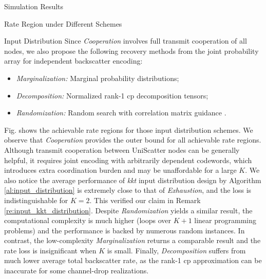 \documentclass[journal]{IEEEtran}
\begin{document}
\begin{section}{Simulation Results}
\begin{subsection}{Rate Region under Different Schemes}
\begin{subsubsection}{Input Distribution}
			Since \emph{Cooperation} involves full transmit cooperation of all nodes, we also propose the following recovery methods from the joint probability array for independent backscatter encoding:
			\begin{itemize}
				\item \emph{Marginalization:} Marginal probability distributions;
				\item \emph{Decomposition:} Normalized rank-\num{1} \gls{cp} decomposition tensors;
				\item \emph{Randomization:} Random search with correlation matrix guidance \cite{Calvo2010}.
			\end{itemize}

			Fig.  shows the achievable rate regions for those input distribution schemes.
			We observe that \emph{Cooperation} provides the outer bound for all achievable rate regions.
			Although transmit cooperation between UniScatter nodes can be generally helpful, it requires joint encoding with arbitrarily dependent codewords, which introduces extra coordination burden and may be unaffordable for a large $K$.
			We also notice the average performance of \emph{\gls{kkt}} input distribution design by Algorithm \ref{al:input_distribution} is extremely close to that of \emph{Exhaustion}, and the loss is indistinguishable for $K=2$.
			This verified our claim in Remark \ref{re:input_kkt_distribution}.
			Despite \emph{Randomization} yields a similar result, the computational complexity is much higher (loops over $K+1$ linear programming problems) and the performance is backed by numerous random instances.
			In contrast, the low-complexity \emph{Marginalization} returns a comparable result and the rate loss is insignificant when $K$ is small.
			Finally, \emph{Decomposition} suffers from much lower average total backscatter rate, as the rank-\num{1} \gls{cp} approximation can be inaccurate for some channel-drop realizations.
		\end{subsubsection}



\end{subsection}
\end{section}
\end{document}
